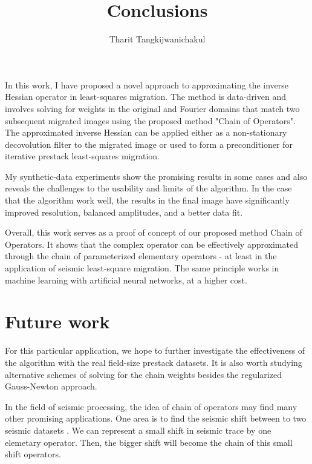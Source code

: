 \title{Conclusions}
\author{Tharit Tangkijwanichakul}
\label{ch:chapter-conclusion}

\maketitle



In this work, I have proposed a novel approach to approximating the inverse Hessian operator in least-squares migration. The method is data-driven and involves solving for weights in the original and Fourier domains that match two subsequent migrated images using the proposed method "Chain of Operators". The approximated inverse Hessian can be applied either as a non-stationary decovolution filter to the migrated image or used to form a preconditioner for iterative prestack least-squares migration.

 My synthetic-data experiments show the promising results in some cases and also reveals the challenges to the usability and limits of the algorithm. In the case that the algorithm work well, the results in the final image have significantly improved resolution, balanced amplitudes, and a better data fit.

 Overall, this work serves as a proof of concept of our proposed method Chain of Operators. It shows that the complex operator can be effectively approximated through the chain of parameterized elementary operators - at least in the application of seismic least-square migration. The same principle works in machine learning with artificial neural networks, at a higher cost.



\section{Future work}
For this particular application, we hope to further investigate the effectiveness of the algorithm with the real field-size prestack datasets. It is also worth studying alternative schemes of solving for the chain weights besides the regularized Gauss-Newton approach.

In the field of seismic processing, the idea of chain of operators may find many other promising applications. One area is to find the seismic shift between to two seismic datasets \cite[]{liner2004nonlinear}. We can represent a small shift in seismic trace by one elemetary operator. Then, the bigger shift will become the chain of this small shift operators.


